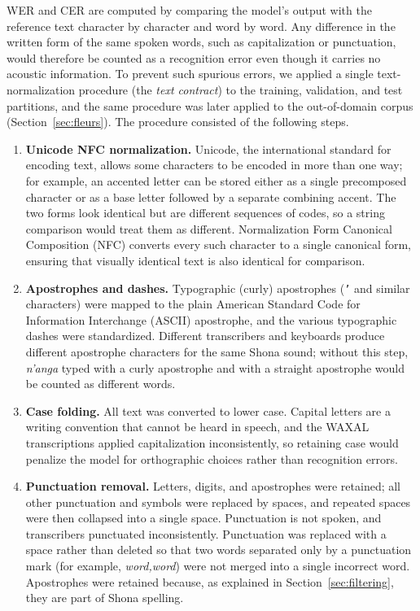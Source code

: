 WER and CER are computed by comparing the model's output with the reference text
character by character and word by word. Any difference in the written form of
the same spoken words, such as capitalization or punctuation, would therefore be
counted as a recognition error even though it carries no acoustic information.
To prevent such spurious errors, we applied a single text-normalization procedure
(the \emph{text contract}) to the training, validation, and test partitions, and
the same procedure was later applied to the out-of-domain corpus
(Section~\ref{sec:fleurs}). The procedure consisted of the following steps.

\begin{enumerate}
    \item \textbf{Unicode NFC normalization.} Unicode, the international standard
    for encoding text, allows some characters to be encoded in more than one way;
    for example, an accented letter can be stored either as a single precomposed
    character or as a base letter followed by a separate combining accent. The two
    forms look identical but are different sequences of codes, so a string
    comparison would treat them as different. Normalization Form Canonical
    Composition (NFC) \citep{UAX15} converts every such character to a single
    canonical form, ensuring that visually identical text is also identical for
    comparison.
    \item \textbf{Apostrophes and dashes.} Typographic (curly) apostrophes
    (\texttt{'} and similar characters) were mapped to the plain American Standard
    Code for Information Interchange (ASCII) apostrophe, and the various
    typographic dashes were standardized. Different transcribers and keyboards
    produce different apostrophe characters for the same Shona sound; without this
    step, \emph{n'anga} typed with a curly apostrophe and with a straight
    apostrophe would be counted as different words.
    \item \textbf{Case folding.} All text was converted to lower case. Capital
    letters are a writing convention that cannot be heard in speech, and the
    WAXAL transcriptions applied capitalization inconsistently, so retaining case
    would penalize the model for orthographic choices rather than recognition
    errors.
    \item \textbf{Punctuation removal.} Letters, digits, and apostrophes were
    retained; all other punctuation and symbols were replaced by spaces, and
    repeated spaces were then collapsed into a single space. Punctuation is not
    spoken, and transcribers punctuated inconsistently. Punctuation was replaced
    with a space rather than deleted so that two words separated only by a
    punctuation mark (for example, \emph{word,word}) were not merged into a single
    incorrect word. Apostrophes were retained because, as explained in
    Section~\ref{sec:filtering}, they are part of Shona spelling.
\end{enumerate}

